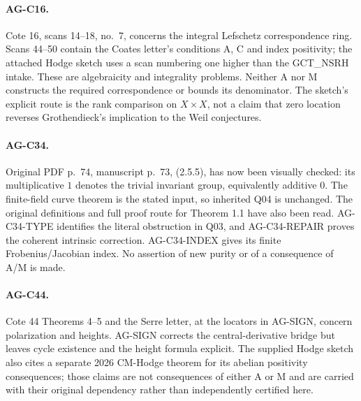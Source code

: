 \documentclass[11pt,a4paper]{article}
\begin{document}
\paragraph{AG-C16.} Cote 16, scans 14--18, no.~7, concerns the integral
Lefschetz correspondence ring. Scans 44--50 contain the Coates letter's
conditions A, C and index positivity; the attached Hodge sketch uses a scan
numbering one higher than the GCT\_NSRH intake. These are algebraicity and
integrality problems. Neither A nor M constructs the required
correspondence or bounds its denominator. The sketch's explicit route is
the rank comparison on $X\times X$, not a claim that zero location
reverses Grothendieck's implication to the Weil conjectures.

\paragraph{AG-C34.} Original PDF p.~74, manuscript p.~73, (2.5.5),
has now been visually checked: its multiplicative $1$ denotes the trivial
invariant group, equivalently additive $0$. The finite-field curve theorem
is the stated input, so inherited Q04 is unchanged. The original
definitions and full proof route for Theorem 1.1 have also been read.
AG-C34-TYPE identifies the literal obstruction in Q03, and
AG-C34-REPAIR proves the coherent intrinsic correction. AG-C34-INDEX
gives its finite Frobenius/Jacobian index. No assertion of new purity or
of a consequence of A/M is made.

\paragraph{AG-C44.} Cote 44 Theorems 4--5 and the Serre letter, at the
locators in AG-SIGN, concern polarization and heights. AG-SIGN corrects
the central-derivative bridge but leaves cycle existence and the
height formula explicit. The supplied Hodge sketch also cites a separate
2026 CM-Hodge theorem for its abelian positivity consequences; those
claims are not consequences of either A or M and are carried with
their original dependency rather than independently certified here.
\end{document}
